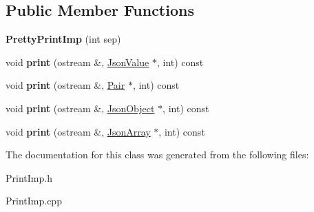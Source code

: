 \subsection*{Public Member Functions}
\begin{DoxyCompactItemize}
\item 
\hypertarget{class_pretty_print_imp_a879f3bbe60fe6e3b402bb36ce08275f4}{{\bfseries Pretty\-Print\-Imp} (int sep)}\label{class_pretty_print_imp_a879f3bbe60fe6e3b402bb36ce08275f4}

\item 
\hypertarget{class_pretty_print_imp_a61f4a7aaa44441f990e8dac892de087e}{void {\bfseries print} (ostream \&, \hyperlink{class_json_value}{Json\-Value} $\ast$, int) const }\label{class_pretty_print_imp_a61f4a7aaa44441f990e8dac892de087e}

\item 
\hypertarget{class_pretty_print_imp_ad7217f95b4f8d520f03d5e182972f627}{void {\bfseries print} (ostream \&, \hyperlink{class_pair}{Pair} $\ast$, int) const }\label{class_pretty_print_imp_ad7217f95b4f8d520f03d5e182972f627}

\item 
\hypertarget{class_pretty_print_imp_ae65661d341c833dc261bf8e38c1b634f}{void {\bfseries print} (ostream \&, \hyperlink{class_json_object}{Json\-Object} $\ast$, int) const }\label{class_pretty_print_imp_ae65661d341c833dc261bf8e38c1b634f}

\item 
\hypertarget{class_pretty_print_imp_a0bee51921e1cb5a7450d96f92f7783b2}{void {\bfseries print} (ostream \&, \hyperlink{class_json_array}{Json\-Array} $\ast$, int) const }\label{class_pretty_print_imp_a0bee51921e1cb5a7450d96f92f7783b2}

\end{DoxyCompactItemize}


The documentation for this class was generated from the following files\-:\begin{DoxyCompactItemize}
\item 
Print\-Imp.\-h\item 
Print\-Imp.\-cpp\end{DoxyCompactItemize}
